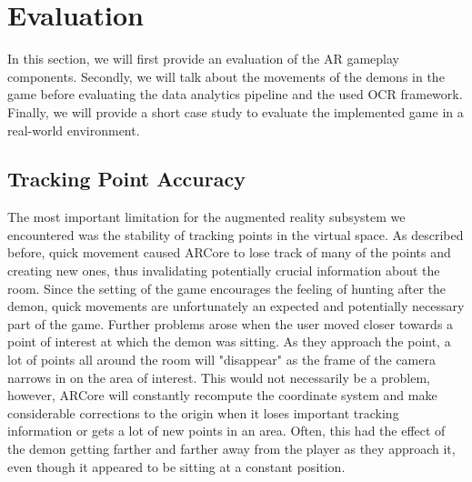 \section{Evaluation}
\label{sec:evaluation}

In this section, we will first provide an evaluation of the AR gameplay components.
Secondly, we will talk about the movements of the demons in the game before evaluating the data analytics pipeline and the used OCR framework.
Finally, we will provide a short case study to evaluate the implemented game in a real-world environment.

\subsection{Tracking Point Accuracy}
The most important limitation for the augmented reality subsystem we encountered was the stability of tracking points in the virtual space.
As described before, quick movement caused ARCore to lose track of many of the points and creating new ones, thus invalidating potentially crucial information about the room.
Since the setting of the game encourages the feeling of hunting after the demon, quick movements are unfortunately an expected and potentially necessary part of the game.
Further problems arose when the user moved closer towards a point of interest at which the demon was sitting.
As they approach the point, a lot of points all around the room will "disappear" as the frame of the camera narrows in on the area of interest.
This would not necessarily be a problem, however, ARCore will constantly recompute the coordinate system and make considerable corrections to the origin when it loses important tracking information or gets a lot of new points in an area.
Often, this had the effect of the demon getting farther and farther away from the player as they approach it, even though it appeared to be sitting at a constant position.

